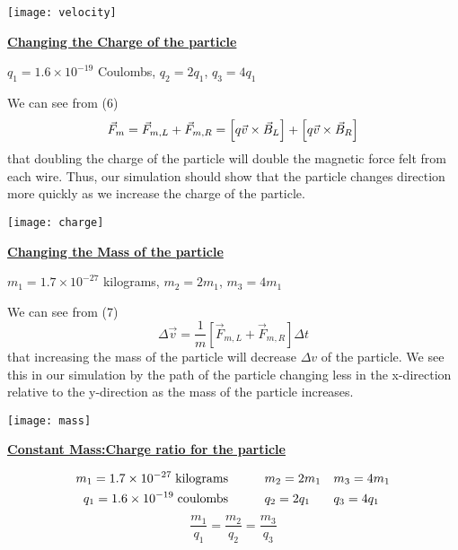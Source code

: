 \documentclass[11pt]{article}
\begin{document}
\begin{center}
\texttt{[image: velocity]}
\end{center}

\newpage
\begin{center}
{\bf\underline{Changing the Charge of the particle}}
\end{center}
\begin{center}
$q_1=1.6\times 10^{-19}$ Coulombs, $q_2=2q_1$, $q_3=4q_1$
\end{center} 

\noindent We can see from (6)
\[
\vec{F}_m=\vec{F}_{m,L}+\vec{F}_{m,R}\\=\left[q\vec{v}\times\vec{B}_L\right]+\left[q\vec{v}\times\vec{B}_R\right]
\]
\noindent that doubling the charge of the particle will double the magnetic force felt from each wire. Thus, our simulation should show that the particle changes direction more quickly as we increase the charge of the particle.
\vspace{.5in}

\begin{center}
\texttt{[image: charge]}
\end{center}

\newpage
\begin{center}
{\bf\underline{Changing the Mass of the particle}}
\end{center}
\begin{center}
$m_1=1.7\times 10^{-27}$ kilograms, $m_2=2m_1$, $m_3=4m_1$
\end{center}

\noindent We can see from (7) 
\[
\Delta\vec{v}=\frac{1}{m}\left[\vec{F}_{m,L}+\vec{F}_{m,R}\right]\Delta t
\]
\noindent that increasing the mass of the particle will decrease $\Delta v$ of the particle. We see this in our simulation by the path of the particle changing less in the x-direction relative to the y-direction as the mass of the particle increases.
\vspace{.5in}

\begin{center}
\texttt{[image: mass]}
\end{center}

\newpage
\begin{center}
{\bf\underline{Constant Mass:Charge ratio for the particle}}
\end{center}
\begin{align*}
m_1=1.7\times 10^{-27}\;\text{kilograms}	&\hspace{.4in}	m_2=2m_1	&&	m_3=4m_1 \\
q_1=1.6\times 10^{-19}\;\text{coulombs}	&\hspace{.4in}	q_2=2q_1	&&	q_3=4q_1
\end{align*}
\vspace{.2in}
\[
\frac{m_1}{q_1}=\frac{m_2}{q_2}=\frac{m_3}{q_3}
\]
\end{document}

